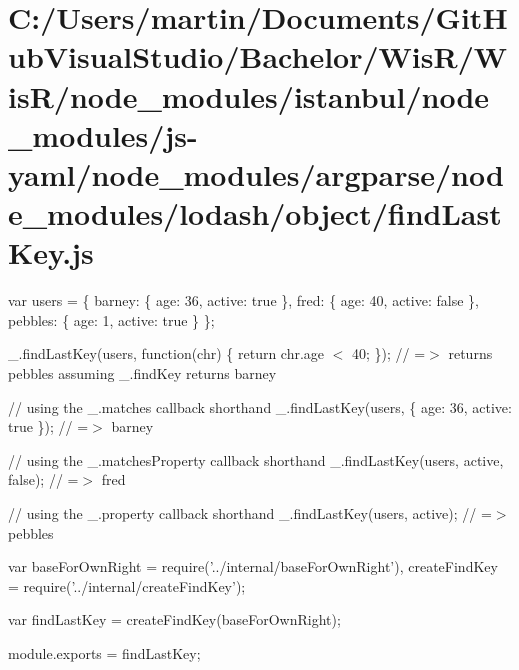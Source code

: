 \hypertarget{_c_1_2_users_2martin_2_documents_2_git_hub_visual_studio_2_bachelor_2_wis_r_2_wis_r_2node_module4c9b6f53f20d43fd2aa368070db0393a}{}\section{C\+:/\+Users/martin/\+Documents/\+Git\+Hub\+Visual\+Studio/\+Bachelor/\+Wis\+R/\+Wis\+R/node\+\_\+modules/istanbul/node\+\_\+modules/js-\/yaml/node\+\_\+modules/argparse/node\+\_\+modules/lodash/object/find\+Last\+Key.\+js}
var users = \{ \textquotesingle{}barney\textquotesingle{}\+: \{ \textquotesingle{}age\textquotesingle{}\+: 36, \textquotesingle{}active\textquotesingle{}\+: true \}, \textquotesingle{}fred\textquotesingle{}\+: \{ \textquotesingle{}age\textquotesingle{}\+: 40, \textquotesingle{}active\textquotesingle{}\+: false \}, \textquotesingle{}pebbles\textquotesingle{}\+: \{ \textquotesingle{}age\textquotesingle{}\+: 1, \textquotesingle{}active\textquotesingle{}\+: true \} \};

\+\_\+.\+find\+Last\+Key(users, function(chr) \{ return chr.\+age $<$ 40; \}); // =$>$ returns {\ttfamily pebbles} assuming {\ttfamily \+\_\+.\+find\+Key} returns {\ttfamily barney}

// using the {\ttfamily \+\_\+.\+matches} callback shorthand \+\_\+.\+find\+Last\+Key(users, \{ \textquotesingle{}age\textquotesingle{}\+: 36, \textquotesingle{}active\textquotesingle{}\+: true \}); // =$>$ \textquotesingle{}barney\textquotesingle{}

// using the {\ttfamily \+\_\+.\+matches\+Property} callback shorthand \+\_\+.\+find\+Last\+Key(users, \textquotesingle{}active\textquotesingle{}, false); // =$>$ \textquotesingle{}fred\textquotesingle{}

// using the {\ttfamily \+\_\+.\+property} callback shorthand \+\_\+.\+find\+Last\+Key(users, \textquotesingle{}active\textquotesingle{}); // =$>$ \textquotesingle{}pebbles\textquotesingle{}


\begin{DoxyCodeInclude}
var baseForOwnRight = require(\textcolor{stringliteral}{'../internal/baseForOwnRight'}),
    createFindKey = require(\textcolor{stringliteral}{'../internal/createFindKey'});

var findLastKey = createFindKey(baseForOwnRight);

module.exports = findLastKey;
\end{DoxyCodeInclude}
 